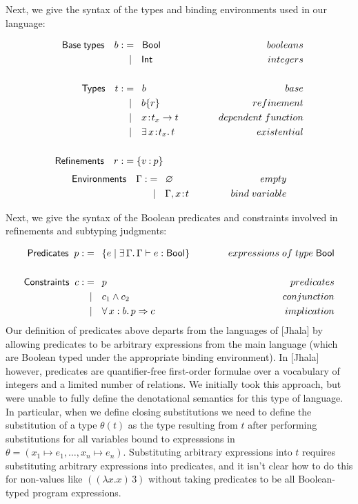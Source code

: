\documentclass[11pt]{article}
\newcommand{\bind}{\hspace{0.1em}{:}\hspace{0.1em}} %
\newcommand{\col}{\mathbin{:}}       %
\begin{document}
Next, we give the syntax of the types and binding environments used in our language:

\begin{align*}
{\sf Base\; types} \quad b :&=\;\;{\sf Bool}{\kern 5em}&booleans\\
                   &\;\;|\quad {\sf Int} &integers \\ \\
{\sf Types} \quad t :&=\;\; b & base \\
                   &\;\;|\quad b\{r\} & refinement \\
                   &\;\;|\quad x\bind t_x \rightarrow t 
                   &dependent\; function\\
                   &\;\;|\quad \exists\, x\bind t_x.\, t 
                   &existential\\ \\
{\sf Refinements} \quad r :&= \{v\col p\} 
\end{align*}
\begin{align*}
{\sf Environments} \quad \Gamma :&=\;\; \varnothing
                   {\kern 5em}& empty \\
                   &\;\;|\quad \Gamma, x\bind t & bind\;variable\\
\end{align*}

Next, we give the syntax of the Boolean predicates and constraints involved in refinements and subtyping judgments:

\begin{align*}
{\sf Predicates} \;\; p :&=\;\: \{ e \;|\; \exists\, \Gamma.\, 
                   \Gamma \vdash e : {\sf Bool}\}
                   {\kern 3 em}& expressions\; of\; type\; {\sf Bool} \\ \\
{\sf Constraints} \;\; c :&=\;\: p  {\kern 3 em}& predicates\\
                   &\;\;|\quad c_1 \wedge c_2 & conjunction\\
                   &\;\;|\quad \forall\, x:b.\, p \Rightarrow c
                   &implication
\end{align*}
Our definition of predicates above departs from the languages of [Jhala] by allowing predicates to be arbitrary expressions from the main language (which are Boolean typed under the appropriate binding environment).
In [Jhala] however, predicates are quantifier-free first-order formulae over a vocabulary of integers and a limited number of relations. We initially took this approach, but were unable to fully define the denotational semantics for this type of language. In particular, when we define closing substitutions we need to define the substitution of a type $\theta(t)$ as the type resulting from $t$ after performing substitutions for all variables bound to expresssions in
$\theta = (x_1 \mapsto e_1, \ldots, x_n \mapsto e_n)$. Substituting arbitrary expressions into $t$ requires substituting arbitrary expressions into predicates, and it isn't clear how to do this for non-values like $((\lambda x. x)\, 3)$ without taking predicates to be all Boolean-typed program expressions. \\
\end{document}
